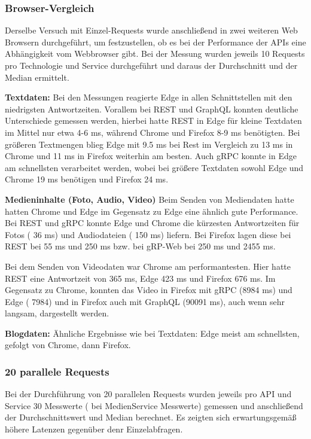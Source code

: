 \clearpage
\subsubsection{Browser-Vergleich}
Derselbe Versuch mit Einzel-Requests wurde anschließend in zwei weiteren Web Browsern durchgeführt, um festzustellen, ob es bei der Performance der APIs eine Abhängigkeit vom Webbrowser gibt. 
Bei der Messung wurden jeweils 10 Requests pro Technologie und Service durchgeführt und daraus der Durchschnitt und der Median ermittelt.


\textbf{Textdaten:}  
Bei den Messungen reagierte Edge in allen Schnittstellen mit den niedrigsten Antwortzeiten. Vorallem bei REST und GraphQL konnten deutliche Unterschiede gemessen werden, hierbei hatte REST in Edge für kleine Textdaten im Mittel nur etwa 4-6 ms, während Chrome und Firefox 8-9 ms benötigten. Bei größeren Textmengen blieg Edge mit 9.5 ms bei Rest im Vergleich zu 13 ms in Chrome und 11 ms in Firefox weiterhin am besten.
Auch gRPC konnte in Edge am schnellsten verarbeitet werden, wobei bei größere Textdaten sowohl Edge und Chrome 19 ms benötigen und Firefox 24 ms. 


\textbf{Medieninhalte (Foto, Audio, Video)}  
Beim Senden von Mediendaten hatte hatten Chrome und Edge im Gegensatz zu Edge eine ähnlich gute Performance. Bei REST und gRPC konnte Edge und Chrome die kürzesten Antwortzeiten für Fotos ( 36 ms) und Audiodateien ( 150 ms)  liefern. Bei Firefox lagen diese bei REST bei 55 ms und 250 ms bzw. bei gRP-Web bei 250 ms und 2455 ms.

Bei dem Senden von Videodaten war Chrome am performantesten. Hier hatte REST eine Antwortzeit von 365 ms, Edge 423 ms und Firefox 676 ms. Im Gegensatz zu Chrome, konnten das Video in Firefox mit gRPC (8984 ms) und Edge ( 7984) und in Firefox auch mit GraphQL (90091 ms), auch wenn sehr langsam, dargestellt werden.


\textbf{Blogdaten:}  
Ähnliche Ergebnisse wie bei Textdaten: Edge meist am schnellsten, gefolgt von Chrome, dann Firefox.

\clearpage
\subsubsection{20 parallele Requests}
Bei der Durchführung von 20 parallelen Requests wurden jeweils pro API und Service 30 Messwerte ( bei MedienService Messwerte) gemessen und anschließend der Durchschnittswert und Median berechnet. Es zeigten sich erwartungsgemäß höhere Latenzen gegenüber denr Einzelabfragen. 

